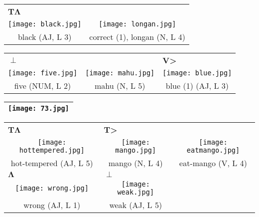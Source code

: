 \documentclass{tufte-book}
\newcommand{\sansnormal}{\sffamily\selectfont}
\begin{document}
\begin{fullwidth}
 \begin{table*}[h!]
\begin{tabular}{cc}
 \multicolumn{1}{l}{{\sansnormal\textbf{T}}$\mathbf\Lambda$}&\multicolumn{1}{l}{} \\
   \texttt{[image: black.jpg]}& \texttt{[image: longan.jpg]}\\
   black (AJ, L 3) & correct (1), longan (N, L 4)\\%
  
 

 
\end{tabular}
\end{table*}

 \begin{table*}[h!]
\begin{tabular}{ccc}
 \multicolumn{1}{l}{$\pmb\perp$}&&\multicolumn{1}{l}{\textbf{{\sansnormal V}>}}  \\
   \texttt{[image: five.jpg]}& \texttt{[image: mahu.jpg]}&  \texttt{[image: blue.jpg]}\\
   five (NUM, L 2) & mahu (N, L 5)& blue (1) (AJ, L 3)\\%
  \end{tabular}
\end{table*}


\begin{table}[h!]
\begin{tabular}{|c|}
\hline
\texttt{[image: 73.jpg]}\\
 
 \hline
\end{tabular}
\label{page:73}
\end{table}

 \begin{table*}[h!]
\begin{tabular}{ccc}
 \multicolumn{1}{l}{\textbf{\sansnormal T}$\mathbf\Lambda$}&\multicolumn{1}{l}{\textbf{{\sansnormal T}>}}&  \\
   \texttt{[image: hottempered.jpg]}& \texttt{[image: mango.jpg]}&  \texttt{[image: eatmango.jpg]}\\
   hot-tempered (AJ, L 5) &  mango (N, L 4) & eat-mango (V, L 4)\\
    \multicolumn{1}{l}{$\mathbf\Lambda$}&\multicolumn{1}{l}{$\pmb\perp$}&  \\
   \texttt{[image: wrong.jpg]}& \texttt{[image: weak.jpg]}& \\
   wrong (AJ, L 1) &  weak (AJ, L 5) & \\%
  \end{tabular}
\end{table*}


\end{fullwidth}
\end{document}

